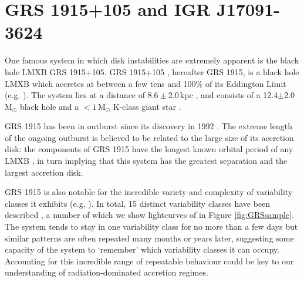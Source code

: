 \section{GRS 1915+105 and IGR J17091-3624}

\par One famous system in which disk instabilities are extremely apparent is the black hole LMXB GRS 1915+105.  GRS 1915+105 \citep{CastroTirado_GRS1915}, hereafter GRS 1915, is a black hole LMXB which accretes at between a few tens and 100\% of its Eddington Limit (e.g. \citealp{Vilhu_SupEd,Done_GRS_HighAcc,Fender_DiskJet}).  The system lies at a distance of $8.6\pm2.0$\,kpc \citep{Reid_Parallax}, and consists of a 12.4$\pm$2.0\,M$_\odot$ black hole and a $<1$\,M$_\odot$ K-class giant star \citep{Reid_Parallax,Ziolkowski_GRSDonor}.
\par GRS 1915 has been in outburst since its discovery in 1992 \citep{CastroTirado_GRS1915}.  The extreme length of the ongoing outburst is believed to be related to the large size of its accretion disk: the components of GRS 1915 have the longest known orbital period of any LMXB \citep{Greiner_BigDisk}, in turn implying that this system has the greatest separation and the largest accretion disk.
\par GRS 1915 is also notable for the incredible variety and complexity of variability classes it exhibits (e.g. \citealp{Yadav_GRSBursts,Belloni_GRS_MI}).  In total, 15 distinct variability classes have been described \citep{Belloni_GRS_MI,KleinWolt_OmegaClass,Hannikainen_NewClass, Pahari_NewClass}, a number of which we show lightcurves of in Figure \ref{fig:GRSsample}.  The system tends to stay in one variability class for no more than a few days but similar patterns are often repeated many months or years later, suggesting some capacity of the system to `remember' which variability classes it can occupy.  Accounting for this incredible range of repeatable behaviour could be key to our understanding of radiation-dominated accretion regimes.

